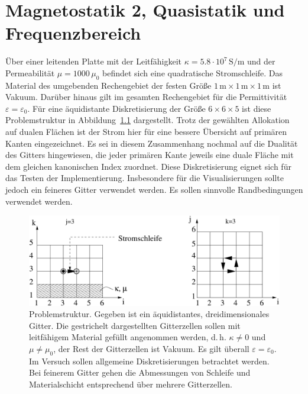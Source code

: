 \documentclass[Protokollheft.tex]{subfiles}
\begin{document}
\chapter{Magnetostatik 2, Quasistatik und Frequenzbereich}

Über einer leitenden Platte mit der Leitfähigkeit $\kappa=5.8\cdot10^7\,\text{S/m}$ und der Permeabilität $\mu=1000\,\mu_0$ befindet sich eine quadratische Stromschleife. 
Das Material des umgebenden Rechengebiet der festen Größe $1\,\text{m}\times1\,\text{m}\times1\,\text{m}$ ist Vakuum. 
Darüber hinaus gilt im gesamten Rechengebiet für die Permittivität $\varepsilon = \varepsilon_0$. 
Für eine äquidistante Diskretisierung der Größe $6\times6\times5$ ist diese Problemstruktur in Abbildung~\ref{fig:strukt} dargestellt.
Trotz der gewählten Allokation auf dualen Flächen ist der Strom hier für eine bessere Übersicht auf primären Kanten eingezeichnet.
Es sei in diesem Zusammenhang nochmal auf die Dualität des Gitters hingewiesen, die jeder primären Kante jeweils eine duale Fläche mit dem gleichen kanonischen Index zuordnet. 
Diese Diskretisierung eignet sich für das Testen der Implementierung. Insbesondere für die Visualisierungen sollte jedoch ein feineres Gitter verwendet werden.
Es sollen sinnvolle Randbedingungen verwendet werden. 
    \begin{figure}[ht!]
        \centerline{%
        \includegraphics[scale=0.75]{v5_prakt3.pdf}
        }
        \caption{Problemstruktur. Gegeben ist ein äquidistantes, dreidimensionales Gitter. Die gestrichelt dargestellten Gitterzellen sollen mit leitfähigem Material gefüllt angenommen werden,
        d.\,h. $\kappa\neq0$ und $\mu\neq\mu_0$, der Rest der Gitterzellen ist Vakuum. Es gilt überall $\varepsilon=\varepsilon_0$. Im Versuch sollen allgemeine Diskretisierungen betrachtet werden. Bei feinerem Gitter gehen die Abmessungen von Schleife und Materialschicht entsprechend über mehrere Gitterzellen.}\label{fig:strukt}
    \end{figure}
\end{document}
